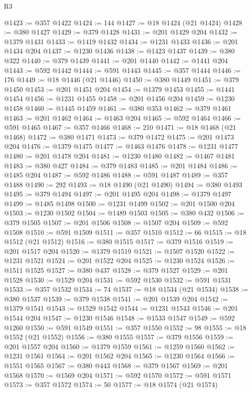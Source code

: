 \begin{lexlean}{R3}
\begin{coremodule}
@1423 := @357 @1422
@1424 := 144
@1427 := @18 @1424 (@21 @1424)
@1428 := @380 @1427
@1429 := @379 @1428
@1431 := @201 @1429 @204
@1432 := @1379 @1431
@1433 := @1419 @1432
@1434 := @1231 @1433
@1436 := @201 @1434 @204
@1437 := @1230 @1436
@1438 := @1423 @1437
@1439 := @380 @322
@1440 := @379 @1439
@1441 := @201 @1440
@1442 := @1441 @204
@1443 := @592 @1442
@1444 := @591 @1443
@1445 := @357 @1444
@1446 := 176
@1449 := @18 @1446 (@21 @1446)
@1450 := @380 @1449
@1451 := @379 @1450
@1453 := @201 @1451 @204
@1454 := @1379 @1453
@1455 := @1441 @1454
@1456 := @1231 @1455
@1458 := @201 @1456 @204
@1459 := @1230 @1458
@1460 := @1445 @1459
@1461 := @380 @353
@1462 := @379 @1461
@1463 := @201 @1462
@1464 := @1463 @204
@1465 := @592 @1464
@1466 := @591 @1465
@1467 := @357 @1466
@1468 := 210
@1471 := @18 @1468 (@21 @1468)
@1472 := @380 @1471
@1473 := @379 @1472
@1475 := @201 @1473 @204
@1476 := @1379 @1475
@1477 := @1463 @1476
@1478 := @1231 @1477
@1480 := @201 @1478 @204
@1481 := @1230 @1480
@1482 := @1467 @1481
@1483 := @380 @427
@1484 := @379 @1483
@1485 := @201 @1484
@1486 := @1485 @204
@1487 := @592 @1486
@1488 := @591 @1487
@1489 := @357 @1488
@1490 := 292
@1493 := @18 @1490 (@21 @1490)
@1494 := @380 @1493
@1495 := @379 @1494
@1497 := @201 @1495 @204
@1498 := @1379 @1497
@1499 := @1485 @1498
@1500 := @1231 @1499
@1502 := @201 @1500 @204
@1503 := @1230 @1502
@1504 := @1489 @1503
@1505 := @380 @432
@1506 := @379 @1505
@1507 := @201 @1506
@1508 := @1507 @204
@1509 := @592 @1508
@1510 := @591 @1509
@1511 := @357 @1510
@1512 := 66
@1515 := @18 @1512 (@21 @1512)
@1516 := @380 @1515
@1517 := @379 @1516
@1519 := @201 @1517 @204
@1520 := @1379 @1519
@1521 := @1507 @1520
@1522 := @1231 @1521
@1524 := @201 @1522 @204
@1525 := @1230 @1524
@1526 := @1511 @1525
@1527 := @380 @437
@1528 := @379 @1527
@1529 := @201 @1528
@1530 := @1529 @204
@1531 := @592 @1530
@1532 := @591 @1531
@1533 := @357 @1532
@1534 := 74
@1537 := @18 @1534 (@21 @1534)
@1538 := @380 @1537
@1539 := @379 @1538
@1541 := @201 @1539 @204
@1542 := @1379 @1541
@1543 := @1529 @1542
@1544 := @1231 @1543
@1546 := @201 @1544 @204
@1547 := @1230 @1546
@1548 := @1533 @1547
@1549 := @592 @1260
@1550 := @591 @1549
@1551 := @357 @1550
@1552 := 98
@1555 := @18 @1552 (@21 @1552)
@1556 := @380 @1555
@1557 := @379 @1556
@1559 := @201 @1557 @204
@1560 := @1379 @1559
@1561 := @1259 @1560
@1562 := @1231 @1561
@1564 := @201 @1562 @204
@1565 := @1230 @1564
@1566 := @1551 @1565
@1567 := @380 @443
@1568 := @379 @1567
@1569 := @201 @1568
@1570 := @1569 @204
@1571 := @592 @1570
@1572 := @591 @1571
@1573 := @357 @1572
@1574 := 50
@1577 := @18 @1574 (@21 @1574)

\end{coremodule}
\end{lexlean}
